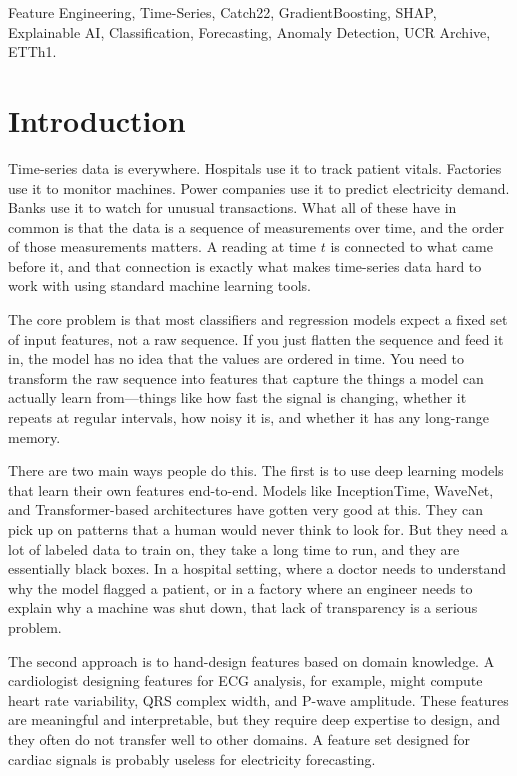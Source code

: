 \documentclass[10pt,conference]{IEEEtran}
\begin{document}
\begin{IEEEkeywords}
Feature Engineering, Time-Series, Catch22, GradientBoosting, SHAP, Explainable AI, Classification, Forecasting, Anomaly Detection, UCR Archive, ETTh1.
\end{IEEEkeywords}

\section{Introduction}

Time-series data is everywhere. Hospitals use it to track patient vitals. Factories use it to monitor machines. Power companies use it to predict electricity demand. Banks use it to watch for unusual transactions. What all of these have in common is that the data is a sequence of measurements over time, and the order of those measurements matters. A reading at time $t$ is connected to what came before it, and that connection is exactly what makes time-series data hard to work with using standard machine learning tools.

The core problem is that most classifiers and regression models expect a fixed set of input features, not a raw sequence. If you just flatten the sequence and feed it in, the model has no idea that the values are ordered in time. You need to transform the raw sequence into features that capture the things a model can actually learn from---things like how fast the signal is changing, whether it repeats at regular intervals, how noisy it is, and whether it has any long-range memory.

There are two main ways people do this. The first is to use deep learning models that learn their own features end-to-end. Models like InceptionTime, WaveNet, and Transformer-based architectures have gotten very good at this. They can pick up on patterns that a human would never think to look for. But they need a lot of labeled data to train on, they take a long time to run, and they are essentially black boxes. In a hospital setting, where a doctor needs to understand why the model flagged a patient, or in a factory where an engineer needs to explain why a machine was shut down, that lack of transparency is a serious problem.

The second approach is to hand-design features based on domain knowledge. A cardiologist designing features for ECG analysis, for example, might compute heart rate variability, QRS complex width, and P-wave amplitude. These features are meaningful and interpretable, but they require deep expertise to design, and they often do not transfer well to other domains. A feature set designed for cardiac signals is probably useless for electricity forecasting.
\end{document}
